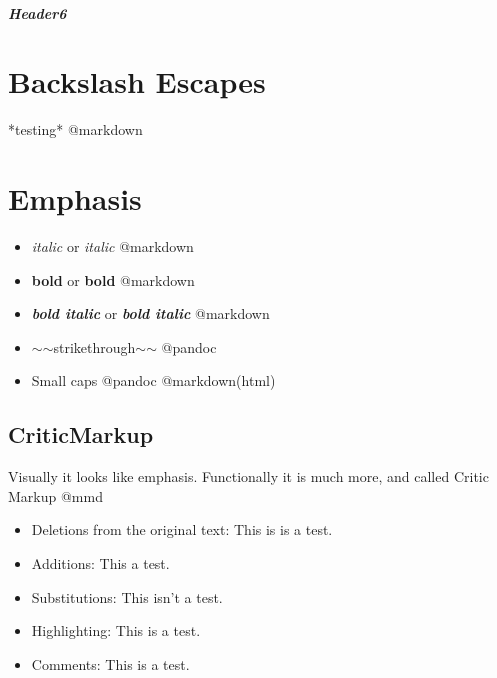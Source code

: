 \subparagraph{Header6}
\label{header6}

\section{Backslash Escapes}
\label{backslashescapes}

*testing* @markdown

\section{Emphasis}
\label{emphasis}

\begin{itemize}
\item \emph{italic} or \emph{italic} @markdown

\item \textbf{bold} or \textbf{bold} @markdown

\item \textbf{\emph{bold italic}} or \textbf{\emph{bold italic}} @markdown

\item \ensuremath{\sim}\ensuremath{\sim}strikethrough\ensuremath{\sim}\ensuremath{\sim} @pandoc

\item Small caps @pandoc @markdown(html)

\end{itemize}

\subsection{CriticMarkup}
\label{criticmarkup}

Visually it looks like emphasis. Functionally it is much more, and called Critic Markup @mmd

\begin{itemize}
\item Deletions from the original text: This is is a test.

\item Additions: This a test.

\item Substitutions: This isn't a test.

\item Highlighting: This is a test.

\item Comments: This is a test.

\end{itemize}

